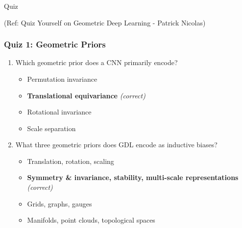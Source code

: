 \begin{frame}[fragile]\frametitle{}
\begin{center}
{\Large Quiz}

{\tiny (Ref: Quiz Yourself on Geometric Deep Learning - Patrick Nicolas)}
\end{center}
\end{frame}

\begin{frame}[fragile]\frametitle{Quiz 1: Geometric Priors}
  \begin{enumerate}
    \item Which geometric prior does a CNN primarily encode?
      \begin{itemize}
        \item[a)] Permutation invariance
        \item[b)] \textbf{Translational equivariance} \textit{(correct)}
        \item[c)] Rotational invariance
        \item[d)] Scale separation
      \end{itemize}
    \vspace{0.4cm}
    \item What three geometric priors does GDL encode as inductive biases?
      \begin{itemize}
        \item[a)] Translation, rotation, scaling
        \item[b)] \textbf{Symmetry \& invariance, stability, multi-scale representations} \textit{(correct)}
        \item[c)] Grids, graphs, gauges
        \item[d)] Manifolds, point clouds, topological spaces
      \end{itemize}
  \end{enumerate}
\end{frame}

